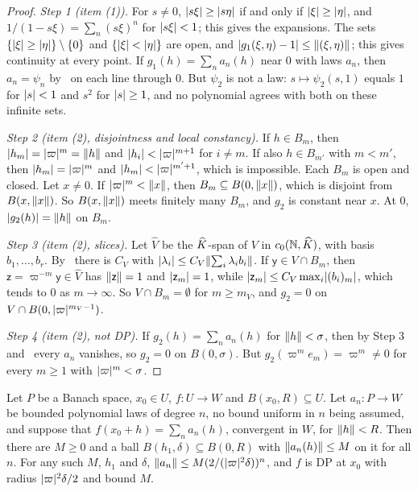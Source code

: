 \begin{proof}
\emph{Step 1 (item (1)).} For $s\ne0$, $\lvert s\xi\rvert\ge\lvert s\eta\rvert$ if and only if $\lvert \xi\rvert\ge\lvert \eta\rvert$, and $1/(1-s\xi)=\sum_n(s\xi)^n$ for $\lvert s\xi\rvert<1$; this gives the expansions. The sets $\{\lvert \xi\rvert\ge\lvert \eta\rvert\}\setminus\{0\}$ and $\{\lvert \xi\rvert<\lvert \eta\rvert\}$ are open, and $\lvert g_1(\xi,\eta)-1\rvert\le\lVert (\xi,\eta)\rVert$; this gives continuity at every point. If $g_1(h)=\sum_na_n(h)$ near $0$ with laws $a_n$, then $a_n=\psi_n$ by~\cite[Lemma~A.1]{I} on each line through $0$. But $\psi_2$ is not a law: $s\mapsto\psi_2(s,1)$ equals $1$ for $\lvert s\rvert<1$ and $s^2$ for $\lvert s\rvert\ge1$, and no polynomial agrees with both on these infinite sets.

\emph{Step 2 (item (2), disjointness and local constancy).} If $h\in B_m$, then $\lvert h_m\rvert=\lvert \varpi\rvert^m=\lVert h\rVert$ and $\lvert h_i\rvert<\lvert \varpi\rvert^{m+1}$ for $i\ne m$. If also $h\in B_{m'}$ with $m<m'$, then $\lvert h_m\rvert=\lvert \varpi\rvert^m$ and $\lvert h_m\rvert<\lvert \varpi\rvert^{m'+1}$, which is impossible. Each $B_m$ is open and closed. Let $x\ne0$. If $\lvert \varpi\rvert^m<\lVert x\rVert$, then $B_m\subseteq B(0,\lVert x\rVert)$, which is disjoint from $B(x,\lVert x\rVert)$. So $B(x,\lVert x\rVert)$ meets finitely many $B_m$, and $g_2$ is constant near $x$. At $0$, $\lvert g_2(h)\rvert=\lVert h\rVert$ on $B_m$.

\emph{Step 3 (item (2), slices).} Let $\widehat V$ be the $\widehat K$-span of $V$ in $c_0(\mathbb N,\widehat K)$, with basis $b_1,\dots,b_r$. By~\cite[Lemma~A.3]{I} there is $C_V$ with $\lvert \lambda_i\rvert\le C_V\lVert \sum_i\lambda_ib_i\rVert$. If $\mathsf y\in V\cap B_m$, then $\mathsf z=\varpi^{-m}\mathsf y\in\widehat V$ has $\lVert \mathsf z\rVert=1$ and $\lvert \mathsf z_m\rvert=1$, while $\lvert \mathsf z_m\rvert\le C_V\max_i\lvert (b_i)_m\rvert$, which tends to $0$ as $m\to\infty$. So $V\cap B_m=\emptyset$ for $m\ge m_V$, and $g_2=0$ on $V\cap B(0,\lvert \varpi\rvert^{m_V-1})$.

\emph{Step 4 (item (2), not DP).} If $g_2(h)=\sum_na_n(h)$ for $\lVert h\rVert<\sigma$, then by Step 3 and~\cite[Lemma~A.1]{I} every $a_n$ vanishes, so $g_2=0$ on $B(0,\sigma)$. But $g_2(\varpi^me_m)=\varpi^m\ne0$ for every $m\ge1$ with $\lvert \varpi\rvert^m<\sigma$.
\end{proof}

\begin{theorem}\label{dp:thm:banach-steinhaus}
Let $P$ be a Banach space, $x_0\in U$, $f\colon U\to W$ and $B(x_0,R)\subseteq U$. Let $a_n\colon P\to W$ be bounded polynomial laws of degree $n$, no bound uniform in $n$ being assumed, and suppose that $f(x_0+h)=\sum_na_n(h)$, convergent in $W$, for $\lVert h\rVert<R$. Then there are $M\ge0$ and a ball $B(h_1,\delta)\subseteq B(0,R)$ with $\lVert a_n(h)\rVert\le M$ on it for all $n$. For any such $M$, $h_1$ and $\delta$, $\lVert a_n\rVert\le M(2/(\lvert \varpi\rvert^2\delta))^n$, and $f$ is DP at $x_0$ with radius $\lvert \varpi\rvert^2\delta/2$ and bound $M$.
\end{theorem}

